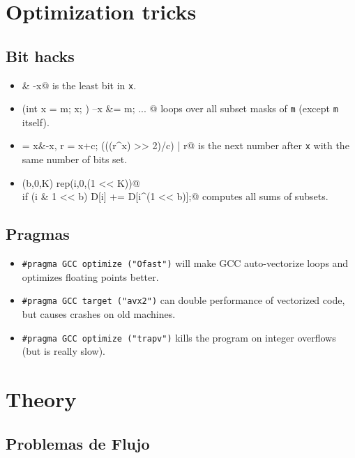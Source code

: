 \section{Optimization tricks}
	\subsection{Bit hacks}
		\begin{itemize}
			\item \verb@x & -x@ is the least bit in \texttt{x}.
			\item \verb@for (int x = m; x; ) { --x &= m; ... }@ loops over all subset masks of \texttt{m} (except \texttt{m} itself).
			\item \verb@c = x&-x, r = x+c; (((r^x) >> 2)/c) | r@ is the next number after \texttt{x} with the same number of bits set.
			\item \verb@rep(b,0,K) rep(i,0,(1 << K))@ \\ \verb@  if (i & 1 << b) D[i] += D[i^(1 << b)];@ computes all sums of subsets.
		\end{itemize}
	\subsection{Pragmas}
		\begin{itemize}
			\item \lstinline{#pragma GCC optimize ("Ofast")} will make GCC auto-vectorize loops and optimizes floating points better.
			\item \lstinline{#pragma GCC target ("avx2")} can double performance of vectorized code, but causes crashes on old machines.
			\item \lstinline{#pragma GCC optimize ("trapv")} kills the program on integer overflows (but is really slow).
		\end{itemize}
	
\section{Theory}
\subsection{Problemas de Flujo}

